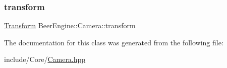 \subsubsection{\texorpdfstring{transform}{transform}}
{\footnotesize\ttfamily \mbox{\hyperlink{class_beer_engine_1_1_transform}{Transform}} Beer\+Engine\+::\+Camera\+::transform}



The documentation for this class was generated from the following file\+:\begin{DoxyCompactItemize}
\item 
include/\+Core/\mbox{\hyperlink{_camera_8hpp}{Camera.\+hpp}}\end{DoxyCompactItemize}
